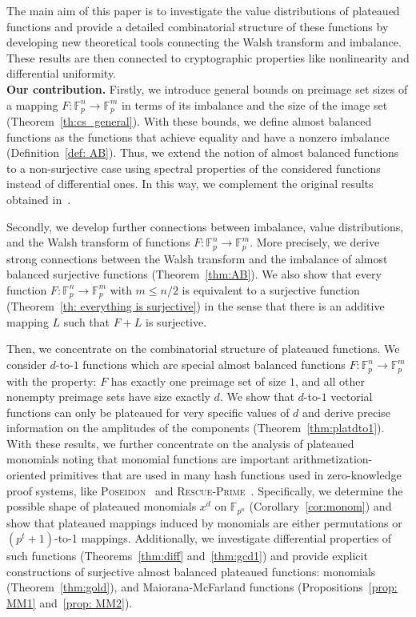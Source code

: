 \documentclass[11pt]{article}
\newcommand{\F}{\mathbb F}
\theoremstyle{plain}
\theoremstyle{definition}
\numberwithin{theorem}{section}
\numberwithin{equation}{section}
\numberwithin{table}{section}
\numberwithin{figure}{section}
\begin{document}
{The main aim of this paper is to investigate the value distributions of plateaued functions and provide a detailed combinatorial structure of these functions by developing new theoretical tools connecting the Walsh transform and imbalance. These results are then connected to cryptographic properties like nonlinearity and differential uniformity. \\

\noindent\textbf{Our contribution.} Firstly, we introduce general bounds on preimage set sizes of a mapping $F\colon\F_p^n\to\F_p^m$ in terms of its imbalance and the size of the image set (Theorem~\ref{th:cs_general}). With these bounds, we define almost balanced functions as the functions that achieve equality and have a nonzero imbalance (Definition~\ref{def: AB}). Thus, we extend the notion of almost balanced functions~\cite{KoelschPolujan2024} to a non-surjective case using spectral properties of the considered functions instead of differential ones. In this way, we complement the original results obtained in~\cite{KoelschPolujan2024}.

Secondly, we develop further connections between imbalance, value distributions, and the Walsh transform of functions $F\colon\F_p^n\to\F_p^m$. More precisely, we derive strong connections between the Walsh transform and the imbalance of almost balanced surjective functions (Theorem~\ref{thm:AB}). We also show that every function $F\colon\F_p^n\to\F_p^m$ with $m\le n/2$ is equivalent to a surjective function (Theorem~\ref{th: everything is surjective}) in the sense that there is an additive mapping $L$ such that $F+L$ is surjective.

Then, we concentrate on the combinatorial structure of plateaued functions. We consider $d$-to-$1$ functions which are special almost balanced functions $F \colon \F_p^n \rightarrow \F_p^m$ with the property: $F$ has exactly one preimage set of size $1$, and all other nonempty preimage sets have size exactly $d$. We show that $d$-to-$1$ vectorial functions can only be plateaued for very specific values of $d$ and derive precise information on the amplitudes of the components (Theorem~\ref{thm:platdto1}). 
With these results, we further concentrate on the analysis of plateaued monomials noting that monomial functions are important arithmetization-oriented primitives that are used in many hash functions used in zero-knowledge proof systems, like \textsc{Poseidon}~\cite{grassi2021poseidon} and \textsc{Rescue-Prime}~\cite{szepieniec2020rescue}. Specifically, we determine the possible shape of plateaued monomials $x^d$ on $\F_{p^n}$ (Corollary~\ref{cor:monom}) and show that plateaued mappings induced by monomials are either permutations or $(p^t+1)$-to-1 mappings. Additionally, we investigate differential properties of such functions (Theorems~\ref{thm:diff} and~\ref{thm:gcd1}) and provide explicit constructions of surjective almost balanced plateaued functions: monomials (Theorem~\ref{thm:gold}), and Maiorana-McFarland functions (Propositions~\ref{prop: MM1} and~\ref{prop: MM2}).

}
\end{document}
